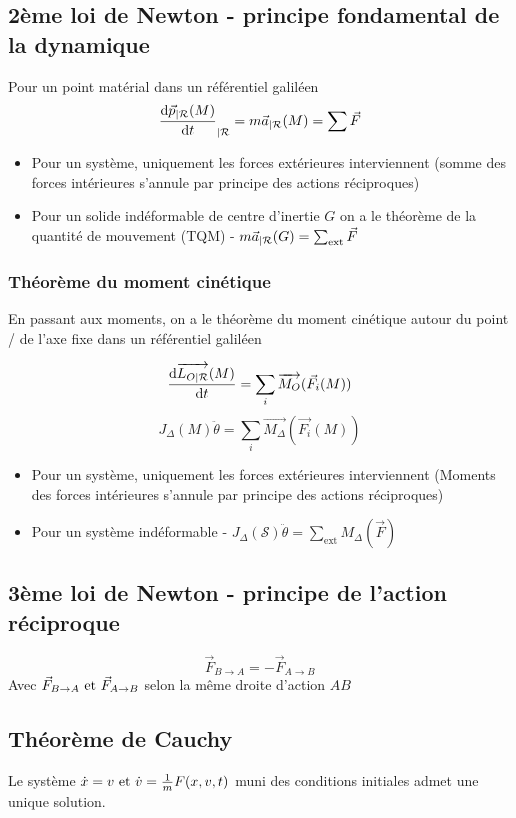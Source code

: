 \documentclass[openany]{book}
\begin{document}
\subsection{2ème loi de Newton - principe fondamental de la dynamique}
Pour un point matérial dans un référentiel galiléen
\[ \frac{\text{d} \vec{p}_{|\mathcal{R}}(M)}{\text{d}t}_{|\mathcal{R}} = m \vec{a}_{|\mathcal{R}}(M) = \sum \vec{F} \]

\begin{itemize}
    \item Pour un système, uniquement les forces extérieures interviennent (somme des forces intérieures s'annule par principe des actions réciproques)
    \item Pour un solide indéformable de centre d'inertie $G$ on a le théorème de la quantité de mouvement (TQM) - $ m \vec{a}_{|\mathcal{R}}(G) = \sum_{\text{ext}} \vec{F} $
\end{itemize}

\subsubsection{Théorème du moment cinétique}
En passant aux moments, on a le théorème du moment cinétique autour du point / de l'axe fixe dans un référentiel galiléen

\[ \frac{\text{d} \overrightarrow{L_{O|\mathcal{R}}}(M)}{\text{d}t} = \sum_{i} \overrightarrow{M_O}(\vec{F_i}(M)) \]
\[ J_{\Delta}(M)\ddot{\theta} = \sum_{i} \overrightarrow{M_{\Delta}}(\vec{F_i}(M)) \]

\begin{itemize}
    \item Pour un système, uniquement les forces extérieures interviennent (Moments des forces intérieures s'annule par principe des actions réciproques)
    \item Pour un système indéformable - $ J_{\Delta}(\mathcal{S}) \ddot{\theta} = \sum_{\text{ext}}M_{\Delta}(\vec{F}) $
\end{itemize}

\subsection{3ème loi de Newton - principe de l'action réciproque}
\[\vec{F}_{B \rightarrow A} = -\vec{F}_{A \rightarrow B}\]
\noindent Avec $\vec{F}_{B \rightarrow A} \text{ et } \vec{F}_{A \rightarrow B}$ selon la même droite d'action $AB$

\subsection{Théorème de Cauchy}
Le système $\dot{x} = v \text{ et } \dot{v} = \frac{1}{m}F(x, v, t)$ muni des conditions initiales admet une unique solution.
\end{document}
